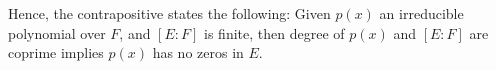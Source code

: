 \documentclass{article}
\begin{document}
\begin{comment}

Now, given that $\deg(p)=n$, then $K'$ as a vector space of $F$, has dimension $n$ (i.e. $[K':F]=n$); on the other hand, given that $m=[E:F]$ is finite, then $E$ as a vector space of $F$ has dimension $m$.

The above implies that $q=[E:K']$ is in fact finite, since $K'$ is a finite-dimensional subspace of vector space $E$ over field $F$. \textbf{(Need to verify)}

Lastly, given $E/K'$ as a field extension, since $q=[E:K']$ by assumption, then there exists distinct nonzero $e_1,...,e_q\in E$ that represents a basis of $E$ as a vector space over $K'$. 

Also, since $n=[K':F]$, then there exists distinct nonzero $k_1,...,k_n\in K'$ that represents a basis of $K'$ as a vector space over $F$. 

Our goal is to prove that the collection $\{k_je_i\ |\ 1\leq j\leq n,\ 1\leq i\leq q\}$, actually represents a basis of $E$ as a vector space over $F$: Based on the given bases of $E/K'$ and $K'/F$ above, for all $f\in E$,
there exists unique $f_1,...,f_q\in K'$, with $f=\sum_{i=1}^{q}f_ie_i$. And, for each $f_i\in K'$, there exists unique $l_1^{(i)},...,l_n^{(i)}\in F$, with $f_i=\sum_{j=1}^{n}l_j^{(i)}k_j$. Hence, the following is true:
$$f=\sum_{i=1}^{q}f_ie_i = \sum_{i=1}^{q}\left(\sum_{j=1}^{n}l_j^{(i)}k_j\right)e_i = \sum_{i=1}^{q}\sum_{j=1}^{n}l_j^{(i)}k_je_i$$
Hence, the collection $\{k_je_i\ |\ 1\leq j\leq n,\ 1\leq i\leq q\}$ actually is a basis of $E/F$.

On the other hand, suppose the collection of scalars $\{l_j^{(i)}\ |\ 1\leq j\leq n,\ 1\leq i\leq q\}$ satisfies $0=\sum_{i=1}^{q}\sum_{j=1}^{n}l_j^{(i)}k_je_i$, then after regrouping, we get the following:
$$0=\sum_{i=1}^{q}\sum_{j=1}^{n}l_j^{(i)}k_je_i= \sum_{i=1}^{q}\left(\sum_{j=1}^{n}l_j^{(i)}k_j\right)e_i$$
Since $e_1,...,e_q\in E/K'$ is a basis of $E$ over field $K'$, the above equation implies that for each $1\leq i\leq q$, the coefficient $\sum_{j=1}^{n}l_{j}^{(i)}k_j=0\in K'$;
similarly, since $k_1,...,k_n\in K'/F$ is a basis of $K'$ over field $f$, the above equation implies that $l_{1}^{(i)},...,l_n^{(i)}=0\in F$, for all $i$ given.

Hence, this proves the linear independence of the collection $\{k_je_i\ |\ 1\leq j\leq n,\ 1\leq i\leq q\}\subset E/F$.

Since the collection is linearly independent while spanning $E/F$, then it is in fact a basis of $E/F$. Hence, as a vector space over $F$, $E$ has dimension $n\cdot q = m$.
\end{comment}
Hence, the contrapositive states the following:
Given $p(x)$ an irreducible polynomial over $F$, and $[E:F]$ is finite, then degree of $p(x)$ and $[E:F]$ are coprime implies $p(x)$ has no zeros in $E$.
\end{document}

